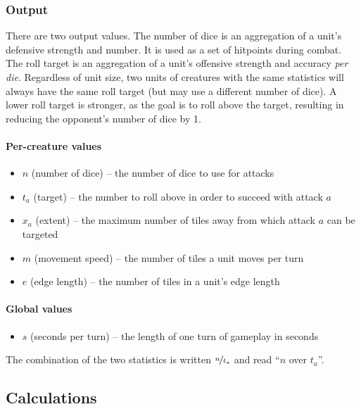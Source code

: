 \subsubsection{Output}

There are two output values.
The number of dice is an aggregation of a unit's defensive strength and number.
It is used as a set of hitpoints during combat.
The roll target is an aggregation
of a unit's offensive strength and accuracy \emph{per die}.
Regardless of unit size,
two units of creatures with the same statistics
will always have the same roll target
(but may use a different number of dice).
A lower roll target is stronger,
as the goal is to roll above the target,
resulting in reducing the opponent's number of dice by 1.

\paragraph{Per-creature values}
\begin{itemize}
    \item $n$ (number of dice) -- the number of dice to use for attacks
    \item $t_a$ (target) -- the number to roll above in order to succeed with attack $a$
    \item $x_a$ (extent) -- the maximum number of tiles away from which attack $a$ can be targeted
    \item $m$ (movement speed) -- the number of tiles a unit moves per turn
    \item $e$ (edge length) -- the number of tiles in a unit's edge length
\end{itemize}

\paragraph{Global values}
\begin{itemize}
    \item $s$ (seconds per turn) -- the length of one turn of gameplay in seconds
\end{itemize}


The combination of the two statistics is written $\nicefrac{n}{t_a}$
and read ``$n$ over $t_a$''.

\subsection{Calculations}


